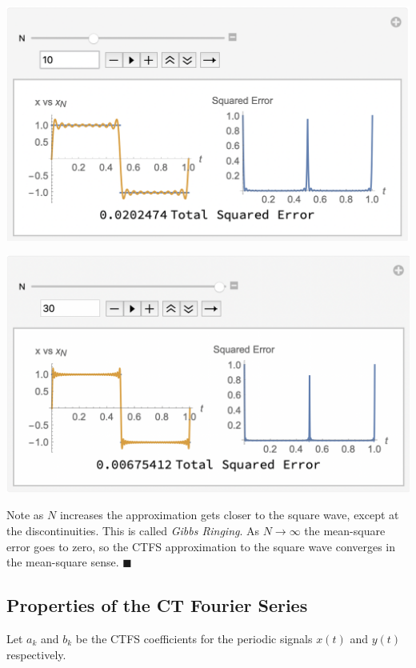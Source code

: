\begin{example}
  \begin{center}
    \includegraphics[scale=0.5]{graphics/squarewaveapprox2.png}
  \end{center}
  \begin{center}
    \includegraphics[scale=0.5]{graphics/squarewaveapprox3.png}
  \end{center}
  Note as $N$ increases the approximation gets closer to the square wave, except at the discontinuities. This is called \emph{Gibbs Ringing}. As $N \rightarrow \infty$ the mean-square error goes to zero, so the CTFS approximation to the square wave converges in the mean-square sense.
  $\blacksquare$
\end{example}


\subsection{Properties of the CT Fourier Series}

Let $a_k$ and $b_k$ be the CTFS coefficients for the periodic signals $x(t)$ and $y(t)$ respectively.

